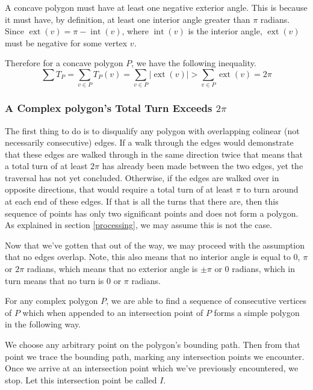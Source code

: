 \documentclass{article}
\newcommand{\inta}{\operatorname{int}} %
\newcommand{\exta}{\operatorname{ext}} %
\begin{document}
A concave polygon must have at least one negative exterior angle. This is because it must have, by definition, at least one interior angle greater than \(\pi\) radians. Since \(\exta(v) = \pi - \inta(v)\), where \(\inta(v)\) is the interior angle, \(\exta(v)\) must be negative for some vertex \(v\).

Therefore for a concave polygon \(P\), we have the following inequality.
\begin{equation*}
	\sum T_P = \sum_{v \in P} T_P(v) = \sum_{v \in P} | \exta(v) | > \sum_{v \in P} \exta(v) = 2\pi
\end{equation*}

\subsubsection{A Complex polygon's Total Turn Exceeds \(2\pi\)}

The first thing to do is to disqualify any polygon with overlapping colinear (not necessarily consecutive) edges. If a walk through the edges would demonstrate that these edges are walked through in the same direction twice that means that a total turn of at least \(2\pi\) has already been made between the two edges, yet the traversal has not yet concluded. Otherwise, if the edges are walked over in opposite directions, that would require a total turn of at least \(\pi\) to turn around at each end of these edges. If that is all the turns that there are, then this sequence of points has only two significant points and does not form a polygon. As explained in section \ref{processing}, we may assume this is not the case.

Now that we've gotten that out of the way, we may proceed with the assumption that no edges overlap. Note, this also means that no interior angle is equal to 0, \(\pi\) or \(2\pi\) radians, which means that no exterior angle is \(\pm\pi\) or 0 radians, which in turn means that no turn is 0 or \(\pi\) radians.

For any complex polygon \(P\), we are able to find a sequence of consecutive vertices of \(P\) which when appended to an intersection point of \(P\) forms a simple polygon in the following way.

We choose any arbitrary point on the polygon's bounding path. Then from that point we trace the bounding path, marking any intersection points we encounter. Once we arrive at an intersection point which we've previously encountered, we stop. Let this intersection point be called \(I\).
\end{document}
